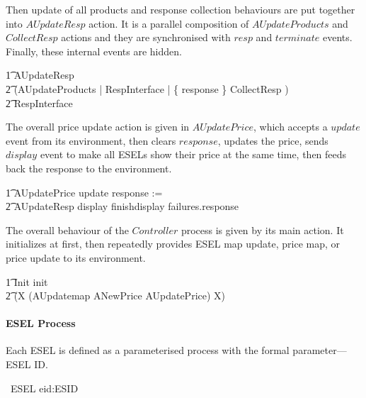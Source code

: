 Then update of all products and response collection behaviours are put together into $AUpdateResp$ action. It is a parallel composition of $AUpdateProducts$ and $CollectResp$ actions and they are synchronised with $resp$ and $terminate$ events. Finally, these internal events are hidden.
\begin{circusaction}
        \t1 AUpdateResp \circdef \\
        \t2 (AUpdateProducts \lpar \emptyset | RespInterface | \{ response \} \rpar CollectResp ) \\
        \t2 \circhide RespInterface \\
\end{circusaction}

The overall price update action is given in $AUpdatePrice$, which accepts a $update$ event from its environment, then clears $response$, updates the price, sends $display$ event to make all ESELs show their price at the same time, then feeds back the response to the environment.
\begin{circusaction}
        \t1 AUpdatePrice \circdef update \then response := \emptyset \circseq \\
            \t2 AUpdateResp \circseq display \then finishdisplay \then failures.response \then \Skip \\ 
\end{circusaction}

The overall behaviour of the $Controller$ process is given by its main action. It initializes at first, then repeatedly provides ESEL map update, price map, or price update to its environment.
\begin{circusaction}
	\t1 \circspot \lschexpract Init \rschexpract \circseq init \then \Skip \circseq \\
    \t2 (\circmu X \circspot (AUpdatemap \extchoice ANewPrice \extchoice AUpdatePrice) \circseq X) \\
\end{circusaction}
\begin{circus}
	\circend
\end{circus}

\paragraph{ESEL Process}
Each ESEL is defined as a parameterised process with the formal parameter---ESEL ID.
\begin{circus}
	\circprocess\ ESEL \circdef eid:ESID \circspot \circbegin \\
\end{circus}

